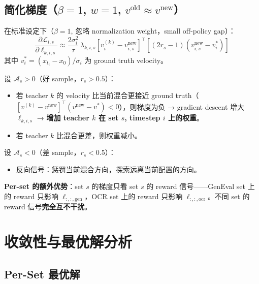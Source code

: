 \documentclass[11pt,a4paper]{article}
\newcommand{\loss}{\mathcal{L}}
\newcommand{\adv}{\mathcal{A}}
\theoremstyle{definition}
\begin{document}
\subsection{简化梯度（$\beta = 1$, $w = 1$, $v^{\mathrm{old}} \approx v^{\mathrm{new}}$）}

在标准设定下（$\beta = 1$, 忽略 normalization weight，small off-policy gap）：
\begin{equation}
\boxed{
\frac{\partial \loss_{i,s}}{\partial \ell_{k,i,s}} \approx \frac{2\sigma_i^2}{\tau}\,\lambda_{k,i,s}
\left[v^{(k)}_i - v^{\mathrm{new}}_{i,s}\right]^\top
\left[(2r_s - 1)(v^{\mathrm{new}}_{i,s} - v^*_i)\right]
}
\label{eq:simplified_grad}
\end{equation}
其中 $v^*_i = (x_{t_i} - x_0)/\sigma_i$ 为 ground truth velocity。

\begin{tcolorbox}[colback=green!5, colframe=green!50, title=梯度动力学解读]
设 $\adv_s > 0$（好 sample，$r_s > 0.5$）：
\begin{itemize}[leftmargin=1em]
\item 若 teacher $k$ 的 velocity 比当前混合更接近 ground truth（$[v^{(k)} - v^{\mathrm{new}}]^\top(v^{\mathrm{new}} - v^*) < 0$），则梯度为负 → gradient descent 增大 $\ell_{k,i,s}$ → \textbf{增加 teacher $k$ 在 set $s$, timestep $i$ 上的权重}。
\item 若 teacher $k$ 比混合更差，则权重减小。
\end{itemize}

设 $\adv_s < 0$（差 sample，$r_s < 0.5$）：
\begin{itemize}[leftmargin=1em]
\item 反向信号：惩罚当前混合方向，探索远离当前配置的方向。
\end{itemize}

\textbf{Per-set 的额外优势}：set $s$ 的梯度只看 set $s$ 的 reward 信号——GenEval set 上的 reward 只影响 $\ell_{:,:,\mathrm{gen}}$，OCR set 上的 reward 只影响 $\ell_{:,:,\mathrm{ocr}}$。不同 set 的 reward 信号\textbf{完全互不干扰}。
\end{tcolorbox}

\section{收敛性与最优解分析}
\label{sec:convergence}

\subsection{Per-Set 最优解}
\end{document}
